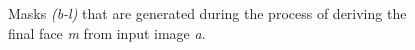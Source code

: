 \begin{figure}[H]
\begin{subfigure}{.24\textwidth}
  \caption{}
\end{subfigure}

\caption{Masks \textit{(b-l)} that are generated during the process of deriving the final face \textit{m} from input image \textit{a}.}
\label{fig:faceMasks}
\end{figure}